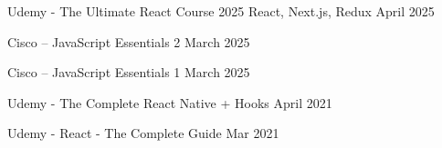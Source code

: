 Udemy - The Ultimate React Course 2025 React, Next.js, Redux  \hfill April 2025 

Cisco – JavaScript Essentials 2  \hfill March 2025

Cisco – JavaScript Essentials 1  \hfill March 2025

Udemy - The Complete React Native + Hooks \hfill April 2021

Udemy - React - The Complete Guide \hfill Mar 2021


